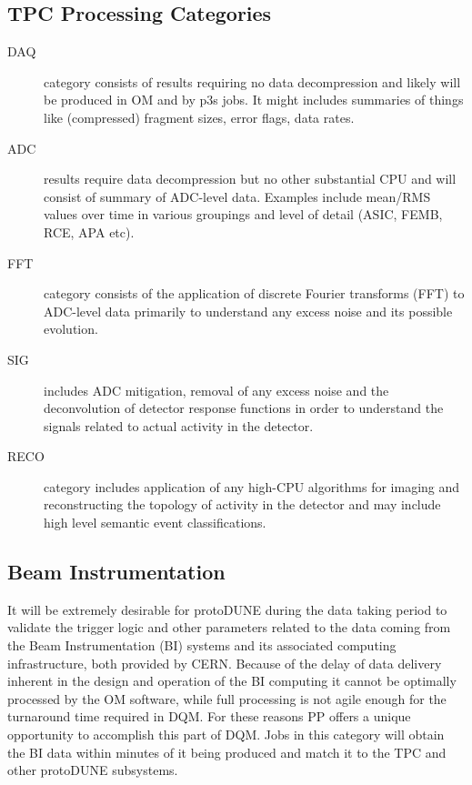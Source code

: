 \documentclass[pdftex,12pt,letter]{article}
\newcommand{\pd}{protoDUNE\xspace}
\begin{document}
\subsection{TPC Processing Categories}
\begin{description}

\item[DAQ] category consists of results requiring no data
  decompression and likely will be produced in OM and by p3s jobs.  It
  might includes summaries of things like (compressed) fragment sizes,
  error flags, data rates.

\item[ADC] results require data decompression but no other substantial
  CPU and will consist of summary of ADC-level data.  Examples include
  mean/RMS values over time in various groupings and level of detail
  (ASIC, FEMB, RCE, APA etc).

\item[FFT] category consists of the application of discrete Fourier
  transforms (FFT) to ADC-level data primarily to understand any
  excess noise and its possible evolution.

\item[SIG] includes ADC mitigation, removal of any excess noise and
  the deconvolution of detector response functions in order to
  understand the signals related to actual activity in the detector.

\item[RECO] category includes application of any high-CPU algorithms
  for imaging and reconstructing the topology of activity in the
  detector and may include high level semantic event classifications.

\end{description}

\subsection{Beam Instrumentation}
It will be extremely desirable for \pd during the data taking
period to validate the trigger logic and other
parameters related to the data coming from the Beam Instrumentation
(BI) systems and its associated computing infrastructure, both provided
by CERN. Because of the delay of data delivery inherent in the design and operation of
the BI computing it cannot be optimally processed by the OM software,
while full processing is not agile enough for the turnaround time required
in DQM. For these reasons PP offers a unique opportunity to accomplish
this part of DQM. Jobs in this category will obtain the BI data within
minutes of it being produced and match it to the TPC and other
\pd subsystems.
\end{document}
